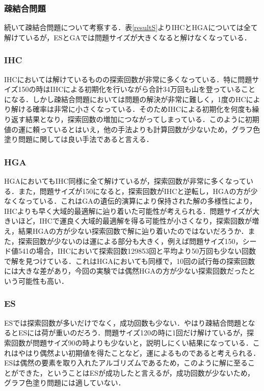 \documentclass[a4j]{jarticle}
\begin{document}
\subsubsection{疎結合問題}
続いて疎結合問題について考察する．表\ref{resultS}よりIHCとHGAについては全て解けているが，ESとGAでは問題サイズが大きくなると解けなくなっている．
\subsubsection*{IHC}
IHCにおいては解けているものの探索回数が非常に多くなっている．特に問題サイズ150の時はIHCによる初期化を行いながら合計34万回も山を登っていることになる．しかし疎結合問題においては問題の解決が非常に難しく，1度のHCにより解ける確率は非常に小さくなっている．そのためIHCによる初期化を何度も繰り返す結果となり，探索回数の増加につながってしまっている．このように初期値の運に頼っているとはいえ，他の手法よりも計算回数が少ないため，グラフ色塗り問題に関しては良い手法であると言える．

\subsubsection*{HGA}
HGAにおいてもIHC同様に全て解けているが，探索回数が非常に多くなっている．また，問題サイズが150になると，探索回数がIHCと逆転し，HGAの方が少なくなっている．これはGAの遺伝的演算により保持された解の多様性により，IHCよりも早く大域的最適解に辿り着いた可能性が考えられる．問題サイズが大きいほど，IHCで運良く大域的最適解を得る可能性が小さくなり，探索回数が増え，結果HGAの方が少ない探索回数で解に辿り着いたのではないだろうか．また，探索回数が少ないのは運による部分も大きく，例えば問題サイズ150，シード値541の場合，IHCにおいて探索回数129853回と平均より50万回も少ない回数で解を見つけている．これはHGAにおいても同様で，10回の試行毎の探索回数には大きな差があり，今回の実験では偶然HGAの方が少ない探索回数だったという可能性も高い．

\subsubsection*{ES}
ESでは探索回数が多いだけでなく，成功回数も少ない．やはり疎結合問題となるとESには荷が重いのだろう．問題サイズ120の時に1回だけ解けているが，探索回数が問題サイズ90の時よりも少ないと，説明しにくい結果になっている．これはやはり偶然よい初期値を得たことなど，運によるものであると考えられる．ESは偶然の要素を取り入れたアルゴリズムであるため，このように解に至ることができた，ということはESが成功したと言えるが，成功回数が少ないため，グラフ色塗り問題には適していない．
\end{document}
